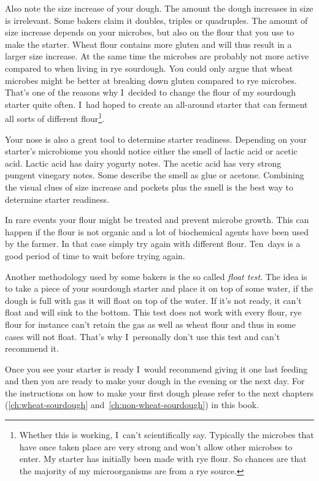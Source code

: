 Also note the size increase of your dough. The amount the dough increases
in size is irrelevant. Some bakers claim it doubles, triples or quadruples.
The amount of size increase depends on your microbes, but also on
the flour that you use to make the starter. Wheat flour contains
more gluten and will thus result in a larger size increase. At
the same time the microbes are probably not more active compared
to when living in rye sourdough. You could only argue that
wheat microbes might be better at breaking down gluten compared
to rye microbes. That's one of the reasons why I~decided to change
the flour of my sourdough starter quite often. I~had hoped to create
an all-around starter that can ferment all sorts of different
flour\footnote{Whether this is working, I~can't scientifically say.
Typically the microbes that have once taken place are very strong
and won't allow other microbes to enter. My starter has initially
been made with rye flour. So chances are that the majority of
my microorganisms are from a rye source.}.

Your nose is also
a great tool to determine starter readiness. Depending on
your starter's microbiome you should notice either the smell
of lactic acid or acetic acid. Lactic acid has dairy yogurty notes.
The acetic acid has very strong pungent vinegary notes. Some
describe the smell as glue or acetone. Combining the visual clues
of size increase and pockets plus the smell is the best way
to determine starter readiness.

In rare events your flour might be treated and prevent microbe growth.
This can happen if the flour is not organic and a lot of biochemical
agents have been used by the farmer. In that case simply try again
with different flour. Ten~days is a good period of time to wait before
trying again.

Another methodology used by some bakers is the so called \emph{float test}.
The idea is to take a piece of your sourdough starter and place it
on top of some water, if the dough is full with gas it will float
on top of the water. If it's not ready, it can't float and will
sink to the bottom. This test does not work with every flour,
rye flour for instance can't retain the gas as well as wheat flour
and thus in some cases will not float. That's why I~personally
don't use this test and can't recommend it.

Once you see your starter is ready I~would recommend giving it
one last feeding and then you are ready to make your dough in the
evening or the next day. For the instructions on how to make your
first dough please refer to the next chapters (\ref{ch:wheat-sourdough}
and~\ref{ch:non-wheat-sourdough}) in this book.

